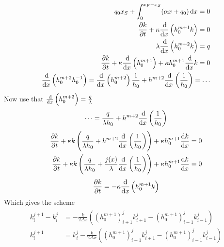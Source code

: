 %
\begin{align*}
    \begin{split}
        q_0 x_S + \int_0^{x_F - x_S}(\alpha x + q_0) \dif{x} = 0 \\
        \frac{\partial k}{ \partial t} + \kappa \frac{\dif}{\dif{x}} \left( h_0^{m+1}k\right) = 0 \\
        \lambda \frac{\dif}{\dif{x}} \left( h_0^{m+2}k\right) = q \\
        \frac{\partial k}{ \partial t}+ \kappa \frac{\dif}{\dif{x}}\left( h_0^{m+1}\right) + \kappa h_0^{m+1}\frac{\dif}{\dif{x}}k = 0\\
        \frac{\dif}{\dif{x}} \left(h_0^{m+2} h_0^{-1}\right) = \frac{\dif}{\dif{x}} \left( h_0^{m+2}\right) \frac{1}{h_0} + h^{m+2} \frac{\dif}{\dif{x}}\left( \frac{1}{h_0}\right) = \dots \\
    \end{split}
\end{align*}
%
Now use that $ \frac{\dif}{\dif{x}} \left( h_0^{m+2}\right) = \frac{q}{\lambda}$
%
\begin{align*}
    \begin{split}
        \dots = \frac{q}{\lambda h_0} + h^{m+2} \frac{\dif}{\dif{x}} \left( \frac{1}{h_0}\right)\\
    \end{split}
\end{align*}
%
\begin{align*}
    \begin{split}
        \frac{\partial k}{ \partial t}+ \kappa k \left( \frac{q}{\lambda h_0} + h^{m+2} \frac{\dif}{\dif{x}} \left(\frac{1}{h_0}\right)\right) + \kappa h_0^{m+1} \frac{\dif{k}}{\dif{x}} = 0 \\
        \frac{\partial k}{ \partial t}+ \kappa k \left( \frac{q}{\lambda h_0} + \frac{j(x)}{\lambda} \frac{\dif}{\dif{x}} \left(\frac{1}{h_0}\right)\right) + \kappa h_0^{m+1} \frac{\dif{k}}{\dif{x}} = 0
    \end{split}
\end{align*}
%
\begin{align*}
    \begin{split}
        \frac{\partial k}{\partial t} = - \kappa \frac{\dif{}}{\dif{x}} \left(h_0^{m+1} k\right)
    \end{split}
\end{align*}
%
Which gives the scheme
\begin{align*}
    \begin{split}
        k_i^{j+1} - k_i^j &= - \frac{k}{2\Delta x} \left( \left(h_0^{m+1}\right)_{i+1}^j k_{i+1}^j - \left( h_0^{m+1}\right)_{i-1}^j k_{i-1}^j \right) \\
        k_i^{j+1} &= k_i^j - \frac{k}{2\Delta x} \left( \left(h_0^{m+1}\right)_{i+1}^j k_{i+1}^j - \left( h_0^{m+1}\right)_{i-1}^j k_{i-1}^j \right) 
    \end{split}
\end{align*}
